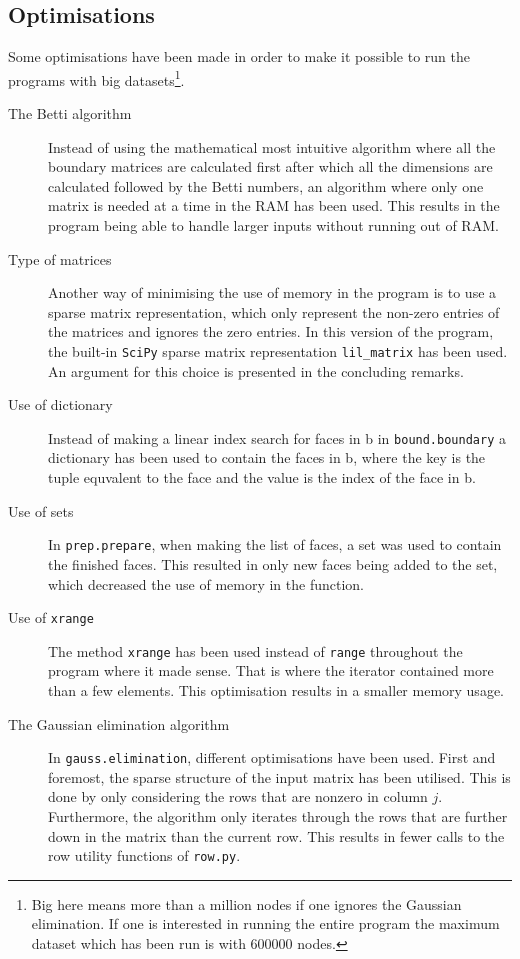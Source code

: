 \documentclass[11pt,a4paper,twoside]{report}
\begin{document}
\subsection{Optimisations}
Some optimisations have been made in order to make it possible to run the programs with big datasets\footnote{Big here means more than a million nodes if one ignores the Gaussian elimination. If one is interested in running the entire program the maximum dataset which has been run is with 600000 nodes.}.
\begin{description}
\item[The Betti algorithm] Instead of using the mathematical most intuitive algorithm where all the boundary matrices are calculated first after which all the dimensions are calculated followed by the Betti numbers, an algorithm where only one matrix is needed at a time in the RAM has been used. This results in the program being able to handle larger inputs without running out of RAM.
\item[Type of matrices] Another way of minimising the use of memory in the program is to use a sparse matrix representation, which only represent the non-zero entries of the matrices and ignores the zero entries. In this version of the program, the built-in \texttt{SciPy} sparse matrix representation \texttt{lil\_matrix} has been used. An argument for this choice is presented in the concluding remarks.
\item[Use of dictionary] Instead of making a linear index search for faces in b in \texttt{bound.boundary} a dictionary has been used to contain the faces in b, where the key is the tuple equvalent to the face and the value is the index of the face in b.
\item[Use of sets] In \texttt{prep.prepare}, when making the list of faces, a set was used to contain the finished faces. This resulted in only new faces being added to the set, which decreased the use of memory in the function.
\item[Use of \texttt{xrange}] The method \texttt{xrange} has been used instead of \texttt{range} throughout the program where it made sense. That is where the iterator contained more than a few elements. This optimisation results in a smaller memory usage.
\item[The Gaussian elimination algorithm] In \texttt{gauss.elimination}, different optimisations have been used. First and foremost, the sparse structure of the input matrix has been utilised. This is done by only considering the rows that are nonzero in column $j$. Furthermore, the algorithm only iterates through the rows that are further down in the matrix than the current row. This results in fewer calls to the row utility functions of \texttt{row.py}. 


\end{description}
\end{document}
